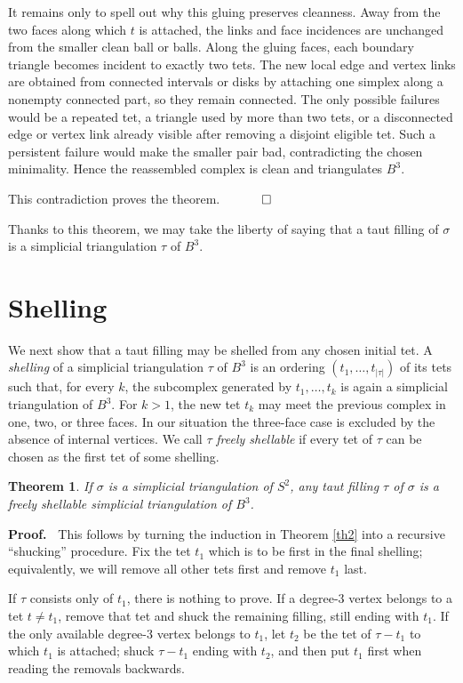 \documentclass[12pt]{article}
\newtheorem{theorem}{Theorem}
\newcommand{\proofstart}{{\noindent \bf Proof.\ }}
\newcommand{\proofend}{$\quad \qed$}
\begin{document}
It remains only to spell out why this gluing preserves cleanness.  Away from
the two faces along which $t$ is attached, the links and face incidences are
unchanged from the smaller clean ball or balls.  Along the gluing faces, each
boundary triangle becomes incident to exactly two tets.  The new local edge
and vertex links are obtained from connected intervals or disks by attaching
one simplex along a nonempty connected part, so they remain connected.  The
only possible failures would be a repeated tet, a triangle used by more than
two tets, or a disconnected edge or vertex link already visible after removing
a disjoint eligible tet.  Such a persistent failure would make the smaller
pair bad, contradicting the chosen minimality.  Hence the reassembled complex
is clean and triangulates $B^3$.

This contradiction proves the theorem.
\proofend

Thanks to this theorem, we may take the liberty of saying that a taut filling
of $\sigma$ is a simplicial triangulation $\tau$ of $B^3$.

\section{Shelling}

We next show that a taut filling may be shelled from any chosen initial tet.
A \emph{shelling} of a simplicial triangulation $\tau$ of $B^3$ is an ordering
$(t_1,\ldots,t_{|\tau|})$ of its tets such that, for every $k$, the subcomplex
generated by $t_1,\ldots,t_k$ is again a simplicial triangulation of $B^3$.
For $k>1$, the new tet $t_k$ may meet the previous complex in one, two, or
three faces.  In our situation the three-face case is excluded by the absence
of internal vertices.  We call $\tau$ \emph{freely shellable} if every tet of
$\tau$ can be chosen as the first tet of some shelling.

\begin{theorem} \label{th3}
If $\sigma$ is a simplicial triangulation of $S^2$, any taut filling $\tau$ of
$\sigma$ is a freely shellable simplicial triangulation of $B^3$.
\end{theorem}

\proofstart
This follows by turning the induction in Theorem \ref{th2} into a recursive
``shucking'' procedure.  Fix the tet $t_1$ which is to be first in the final
shelling; equivalently, we will remove all other tets first and remove $t_1$
last.

If $\tau$ consists only of $t_1$, there is nothing to prove.  If a degree-$3$
vertex belongs to a tet $t\neq t_1$, remove that tet and shuck the remaining
filling, still ending with $t_1$.  If the only available degree-$3$ vertex
belongs to $t_1$, let $t_2$ be the tet of $\tau-t_1$ to which $t_1$ is
attached; shuck $\tau-t_1$ ending with $t_2$, and then put $t_1$ first when
reading the removals backwards.
\end{document}
